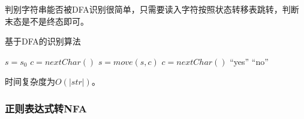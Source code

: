 判别字符串能否被DFA识别很简单，只需要读入字符按照状态转移表跳转，判断末态是不是终态即可。
\begin{algorithm}[H]
\centering
\caption{基于DFA的识别算法}
\begin{algorithmic}[1]
\State $s=s_0$
\State $c=nextChar()$
\State $s=move(s,c)$
\State $c=nextChar()$
\EndWhile
{}
\State
\Return ``yes''
\Else
\Return ``no''
\EndIf
\end{algorithmic}
\end{algorithm}
时间复杂度为$O(|str|)$。

\subsubsection{正则表达式转NFA}

